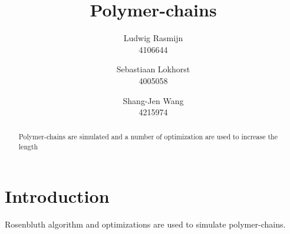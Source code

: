 \documentclass[a4paper,twocolumn]{article}
\begin{document}
\title{Polymer-chains}
\date{}
\author{Ludwig Rasmijn\\ 4106644 \and Sebastiaan Lokhorst\\ 4005058 \and Shang-Jen Wang\\ 4215974}
\maketitle

\begin{abstract}
    Polymer-chains are simulated and a number of optimization are used to increase the length
\end{abstract}

\section{Introduction}
Rosenbluth algorithm and optimizations are used to simulate polymer-chains. 
 
\end{document}
